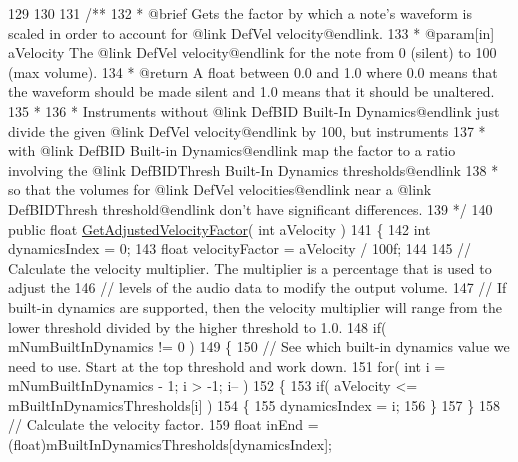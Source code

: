 \begin{DoxyCodeInclude}
129 
130 \textcolor{comment}{}
131 \textcolor{comment}{    /**}
132 \textcolor{comment}{     * @brief Gets the factor by which a note's waveform is scaled in order to account for @link DefVel
       velocity@endlink.}
133 \textcolor{comment}{     * @param[in] aVelocity The @link DefVel velocity@endlink for the note from 0 (silent) to 100 (max
       volume).}
134 \textcolor{comment}{     * @return A float between 0.0 and 1.0 where 0.0 means that the waveform should be made silent and 1.0
       means that it should be unaltered.}
135 \textcolor{comment}{     * }
136 \textcolor{comment}{     * Instruments without @link DefBID Built-In Dynamics@endlink just divide the given @link DefVel
       velocity@endlink by 100, but instruments}
137 \textcolor{comment}{     * with @link DefBID Built-in Dynamics@endlink map the factor to a ratio involving the @link
       DefBIDThresh Built-In Dynamics thresholds@endlink}
138 \textcolor{comment}{     * so that the volumes for @link DefVel velocities@endlink near a @link DefBIDThresh threshold@endlink
       don't have significant differences.}
139 \textcolor{comment}{     */}
140     \textcolor{keyword}{public} \textcolor{keywordtype}{float} \hyperlink{group___v_i_base_pub_func_gae638c68bd0e79d0b99495be69e50f49d}{GetAdjustedVelocityFactor}( \textcolor{keywordtype}{int} aVelocity )
141     \{
142         \textcolor{keywordtype}{int} dynamicsIndex = 0;
143         \textcolor{keywordtype}{float} velocityFactor = aVelocity / 100f;
144 
145         \textcolor{comment}{// Calculate the velocity multiplier. The multiplier is a percentage that is used to adjust the}
146         \textcolor{comment}{// levels of the audio data to modify the output volume. }
147         \textcolor{comment}{// If built-in dynamics are supported, then the velocity multiplier will range from the lower
       threshold divided by the higher threshold to 1.0.}
148         \textcolor{keywordflow}{if}( mNumBuiltInDynamics != 0 )
149         \{
150             \textcolor{comment}{// See which built-in dynamics value we need to use. Start at the top threshold and work down.}
151             \textcolor{keywordflow}{for}( \textcolor{keywordtype}{int} i = mNumBuiltInDynamics - 1; i > -1; i-- )
152             \{
153                 \textcolor{keywordflow}{if}( aVelocity <= mBuiltInDynamicsThresholds[i] )
154                 \{
155                     dynamicsIndex = i;
156                 \}
157             \}
158             \textcolor{comment}{// Calculate the velocity factor.}
159             \textcolor{keywordtype}{float} inEnd = (float)mBuiltInDynamicsThresholds[dynamicsIndex];

\end{DoxyCodeInclude}
